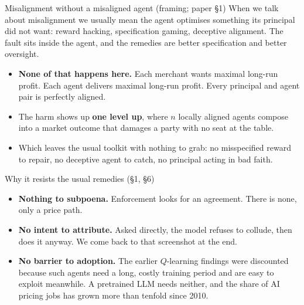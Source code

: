 \documentclass[aspectratio=169,9pt]{beamer}
\newcommand{\orange}[1]{\textcolor{AmazonOrange}{\textbf{#1}}}
\newcommand{\blue}[1]{\textcolor{densityblue}{\textbf{#1}}}
\newcommand{\muted}[1]{\textcolor{EPICMuted}{#1}}
\begin{document}
\begin{frame}{Misalignment without a misaligned agent \muted{(framing; paper \S1)}}
When we talk about misalignment we usually mean the agent optimises something its principal did not want:
reward hacking, specification gaming, deceptive alignment. The fault sits inside the agent, and the remedies
are better specification and better oversight.
\vspace{0.2cm}
\pause
\begin{itemize}
    \item \orange{None of that happens here.} Each merchant wants maximal long-run profit. Each agent delivers
    maximal long-run profit. Every principal and agent pair is perfectly aligned.
    \pause
    \item The harm shows up \blue{one level up}, where $n$ locally aligned agents compose into a market outcome
    that damages a party with no seat at the table.
    \pause
    \item Which leaves the usual toolkit with nothing to grab: no misspecified reward to repair, no deceptive
    agent to catch, no principal acting in bad faith.
\end{itemize}
\vspace{0.3cm}
\pause
{}
\end{frame}

\begin{frame}{Why it resists the usual remedies \muted{(\S1, \S6)}}
\begin{itemize}
    \item \orange{Nothing to subpoena.} Enforcement looks for an agreement. There is none, only a price path.
    \pause
    \item \orange{No intent to attribute.} Asked directly, the model refuses to collude, then does it anyway.
    We come back to that screenshot at the end.
    \pause
    \item \orange{No barrier to adoption.} The earlier $Q$-learning findings were discounted because such
    agents need a long, costly training period and are easy to exploit meanwhile. A pretrained LLM needs
    neither, and the share of AI pricing jobs has grown more than tenfold since 2010.
\end{itemize}
\vspace{0.3cm}
\pause
{}
\end{frame}
\end{document}
